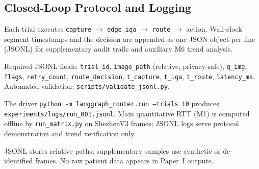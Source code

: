 \subsection{Closed-Loop Protocol and Logging}
\label{sec:closed-loop}

Each trial executes \texttt{capture} $\rightarrow$ \texttt{edge\_iqa} $\rightarrow$ \texttt{route} $\rightarrow$ action. Wall-clock segment timestamps and the decision are appended as one JSON object per line (JSONL) for supplementary audit trails and auxiliary M6 trend analysis.

Required JSONL fields: \texttt{trial\_id}, \texttt{image\_path} (relative, privacy-safe), \texttt{q\_img}, \texttt{flags}, \texttt{retry\_count}, \texttt{route\_decision}, \texttt{t\_capture}, \texttt{t\_iqa}, \texttt{t\_route}, \texttt{latency\_ms}. Automated validation: \texttt{scripts/validate\_jsonl.py}.

The driver \texttt{python\ -m\ langgraph\_router.run\ --trials\ 10} produces \texttt{experiments/logs/run\_001.jsonl}. Main quantitative RTT (M1) is computed offline by \texttt{run\_matrix.py} on ShezhenV3 frames; JSONL logs serve protocol demonstration and trend verification only.

JSONL stores relative paths; supplementary samples use synthetic or de-identified frames. No raw patient data appears in Paper~I outputs.

